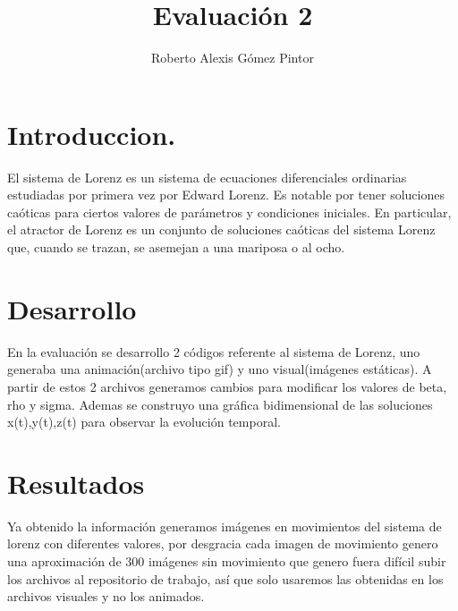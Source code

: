 \documentclass{article}
\title{Evaluación 2}
\author{Roberto Alexis Gómez Pintor}
\begin{document}
\maketitle
\section{Introduccion.}
El sistema de Lorenz es un sistema de ecuaciones diferenciales ordinarias estudiadas por primera vez por Edward Lorenz. Es notable por tener soluciones caóticas para ciertos valores de parámetros y condiciones iniciales. En particular, el atractor de Lorenz es un conjunto de soluciones caóticas del sistema Lorenz que, cuando se trazan, se asemejan a una mariposa o al ocho.
\section{Desarrollo}
En la evaluación se desarrollo 2 códigos referente al sistema de Lorenz, uno generaba una animación(archivo tipo gif) y uno visual(imágenes estáticas). A partir de estos 2 archivos generamos cambios para modificar los valores de beta, rho y sigma. Ademas se construyo una gráfica bidimensional de las soluciones x(t),y(t),z(t) para observar la evolución temporal.
\section{Resultados}
Ya obtenido la información generamos imágenes en movimientos del sistema de lorenz con diferentes valores, por desgracia cada imagen de movimiento genero una aproximación de 300 imágenes sin movimiento que genero fuera difícil subir los archivos al repositorio de trabajo, así que solo usaremos las obtenidas en los archivos visuales y no los animados.
\end{document}
